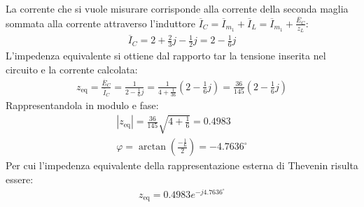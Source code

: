 \documentclass{article}
\begin{document}
La corrente che si vuole misurare corrisponde alla corrente della seconda maglia sommata alla corrente 
attraverso l'induttore $\overline{I}_C=\overline{I}_{m_1}+\overline{I}_L=\overline{I}_{m_1}+\frac{\overline{E}_C}{z_L}$:
\begin{gather*}
    \overline{I}_C=2+\displaystyle\frac{2}{3}j-\frac{1}{2}j=2-\frac{1}{6}j
\end{gather*}
L'impedenza equivalente si ottiene dal rapporto tar la tensione inserita nel circuito e la corrente calcolata:
\begin{gather*}
    z_\mathrm{eq}=\displaystyle\frac{\overline{E}_C}{\overline{I}_C}=\frac{1}{2-\frac{1}{6}j}=\frac{1}{4+\frac{1}{36}}\left(2-\frac{1}{6}j\right)=\frac{36}{145}\left(2-\frac{1}{6}j\right)
\end{gather*}
Rappresentandola in modulo e fase:
\begin{gather*}
    |z_\mathrm{eq}|=\displaystyle\frac{36}{145}\sqrt{4+\frac{1}{6}}=0.4983\\
    \varphi=\arctan\left(\frac{-\frac{1}{6}}{2}\right)=-4.7636^{\circ}
\end{gather*}
Per cui l'impedenza equivalente della rappresentazione esterna di Thevenin risulta essere:
\begin{gather}
    z_\mathrm{eq}=0.4983e^{-j4.7636^{\circ}}
\end{gather}

\clearpage 
\end{document}
